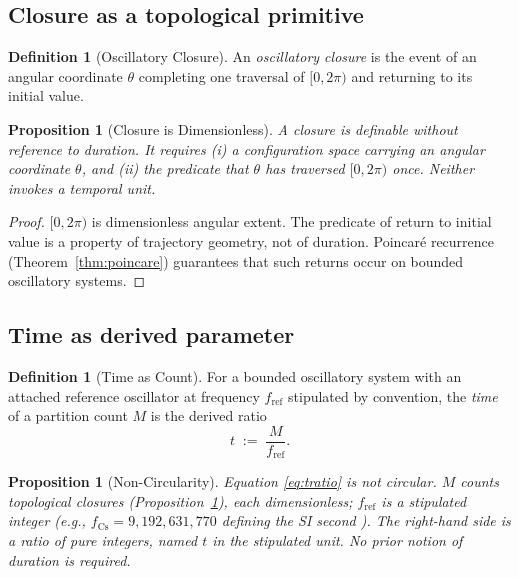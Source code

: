 \documentclass[twocolumn,10pt,a4paper]{article}
\theoremstyle{thmstyle}
\newtheorem{proposition}[theorem]{Proposition}
\theoremstyle{definition}
\newtheorem{definition}[theorem]{Definition}
\theoremstyle{remark}
\begin{document}
\subsection{Closure as a topological primitive}

\begin{definition}[Oscillatory Closure]
\label{def:closure}
An \emph{oscillatory closure} is the event of an angular coordinate
$\theta$ completing one traversal of $[0,2\pi)$ and returning to its
initial value.
\end{definition}

\begin{proposition}[Closure is Dimensionless]
\label{prop:closure}
A closure is definable without reference to duration. It requires (i)
a configuration space carrying an angular coordinate $\theta$, and
(ii) the predicate that $\theta$ has traversed $[0,2\pi)$ once.
Neither invokes a temporal unit.
\end{proposition}

\begin{proof}
$[0,2\pi)$ is dimensionless angular extent. The predicate of return
to initial value is a property of trajectory geometry, not of duration.
Poincar\'{e} recurrence (Theorem~\ref{thm:poincare}) guarantees that
such returns occur on bounded oscillatory systems.
\end{proof}

\subsection{Time as derived parameter}

\begin{definition}[Time as Count]
\label{def:tcount}
For a bounded oscillatory system with an attached reference oscillator
at frequency $f_{\mathrm{ref}}$ stipulated by convention, the
\emph{time} of a partition count $M$ is the derived ratio
\begin{equation}
t\;:=\;\frac{M}{f_{\mathrm{ref}}}.
\label{eq:tratio}
\end{equation}
\end{definition}

\begin{proposition}[Non-Circularity]
\label{prop:nocirc}
Equation \eqref{eq:tratio} is not circular. $M$ counts topological
closures (Proposition~\ref{prop:closure}), each dimensionless;
$f_{\mathrm{ref}}$ is a stipulated integer (e.g., $f_{\mathrm{Cs}}=
9{,}192{,}631{,}770$ defining the SI second \citep{si2019}). The
right-hand side is a ratio of pure integers, named $t$ in the
stipulated unit. No prior notion of duration is required.
\end{proposition}
\end{document}
